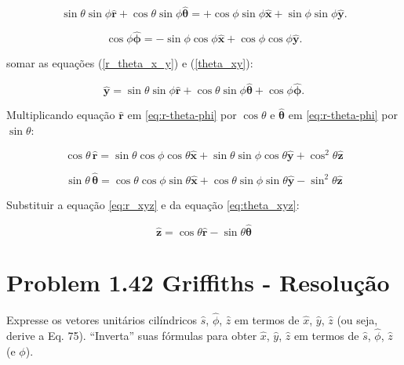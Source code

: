 \documentclass[a4paper,12pt]{article}
\begin{document}
\begin{equation}\label{r_theta_x_y}
\sin\theta \sin\phi \hat{\mathbf{r}} + \cos\theta \sin\phi \hat{\bm{\theta}} = +\cos\phi \sin\phi \hat{\mathbf{x}} + \sin\phi \sin\phi \hat{\mathbf{y}}.
\end{equation}
    
\begin{equation}\label{theta_xy}
\cos\phi\hat{\bm{\phi}} = -\sin\phi \cos\phi \hat{\mathbf{x}} + \cos\phi \cos\phi \hat{\mathbf{y}}.
\end{equation}

somar as equações (\ref{r_theta_x_y}) e (\ref{theta_xy}):

\begin{equation}
\hat{\mathbf{y}} = \sin\theta \sin\phi \hat{\mathbf{r}} + \cos\theta \sin\phi \hat{\bm{\theta}} + \cos\phi\hat{\bm{\phi}}.
\end{equation}

Multiplicando equação $\hat{\mathbf{r}}$ em  \ref{eq:r-theta-phi} por $\cos\theta$ e $\hat{\bm{\theta}}$ em \ref{eq:r-theta-phi} por $\sin\theta$:

\begin{equation}\label{eq:r_xyz}
\cos\theta \, \hat{\mathbf{r}} = \sin\theta \cos\phi \cos\theta \hat{\mathbf{x}} + \sin\theta \sin\phi \cos\theta \hat{\mathbf{y}} + \cos^{2}\theta \hat{\mathbf{z}}
\end{equation}

\begin{equation}\label{eq:theta_xyz}
\sin\theta \, \hat{\bm{\theta}} = \cos\theta \cos\phi \sin\theta \hat{\mathbf{x}} + \cos\theta \sin\phi \sin\theta \hat{\mathbf{y}} - \sin^{2}\theta  \hat{\mathbf{z}}
\end{equation}

Substituir a equa\c{c}\~ao \ref{eq:r_xyz} e da equa\c{c}\~ao \ref{eq:theta_xyz}:

\begin{equation}
\hat{\mathbf{z}} = \cos\theta \hat{\mathbf{r}} - \sin\theta \hat{\bm{\theta}}
\end{equation}


\section*{Problem 1.42 Griffiths - Resolu\c{c}\~ao}

Expresse os vetores unitários cilíndricos $\hat{s}$, $\hat{\phi}$, $\hat{z}$ em termos 
de $\hat{x}$, $\hat{y}$, $\hat{z}$ (ou seja, derive a Eq. 75). ``Inverta'' suas fórmulas 
para obter $\hat{x}$, $\hat{y}$, $\hat{z}$ em termos de $\hat{s}$, $\hat{\phi}$, $\hat{z}$ (e $\phi$).
\end{document}
